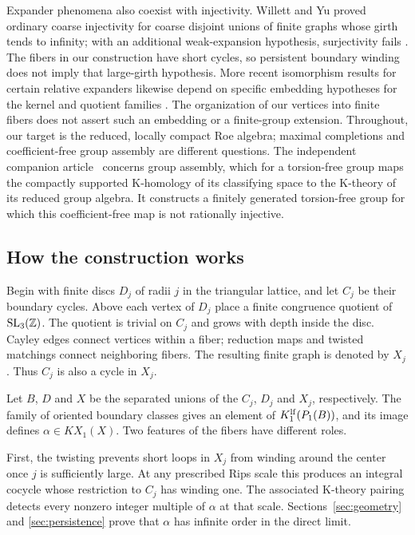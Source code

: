 Expander phenomena also coexist with injectivity. Willett and Yu proved
ordinary coarse injectivity for coarse disjoint unions of finite graphs
whose girth tends to infinity; with an additional weak-expansion hypothesis,
surjectivity fails \cite[Theorem~1.5]{WY12I}. The fibers in our construction
have short cycles, so persistent boundary winding does not imply that
large-girth hypothesis. More recent isomorphism results for certain relative
expanders likewise depend on specific embedding hypotheses for the kernel
and quotient families \cite[Theorem~1.1]{DWY23}. The organization of our
vertices into finite fibers does not assert such an embedding or a finite-group
extension. Throughout, our target is the reduced, locally compact Roe algebra;
maximal completions and coefficient-free group assembly are different
questions.
The independent companion article~\cite[Theorem~1.1]{OpenAITorsionFreeBC2026}
concerns group assembly, which for a torsion-free group maps the compactly supported K-homology
of its classifying space to the K-theory of its reduced group algebra. It
constructs a finitely generated torsion-free group for which this
coefficient-free map is not rationally injective.

\subsection*{How the construction works}
Begin with finite discs $D_j$ of radii $j$ in the triangular lattice, and let $C_j$ be their
boundary cycles. Above each vertex of $D_j$ place a finite congruence quotient
of $\operatorname{SL}_3(\mathbb Z)$. The quotient is trivial on $C_j$ and grows with depth inside
the disc. Cayley edges connect vertices within a fiber; reduction maps and
twisted matchings connect neighboring fibers. The resulting finite graph is
denoted by $X_j$. Thus $C_j$ is also a cycle in $X_j$.

Let $B$, $D$ and $X$ be the separated unions of the $C_j$, $D_j$ and $X_j$,
respectively. The family of oriented boundary classes gives an element of
$K_1^{\mathrm{lf}}(P_1(B))$, and its image defines $\alpha\in KX_1(X)$. Two features
of the fibers have different roles.

First, the twisting prevents short loops in $X_j$ from winding around the
center once $j$ is sufficiently large. At any prescribed Rips scale this
produces an integral cocycle whose restriction to $C_j$ has winding one.
The associated K-theory pairing detects every nonzero integer multiple of
$\alpha$ at that scale. Sections~\ref{sec:geometry} and
\ref{sec:persistence} prove that $\alpha$ has infinite order in the direct
limit.

